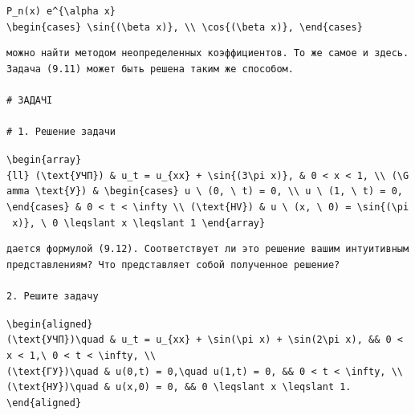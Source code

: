 \documentclass[
  ukrainian,
]{article}
\begin{document}
\texttt{P\_n(x)\ e\^{}\{\textbackslash{}alpha\ x\}}
\texttt{\textbackslash{}begin\{cases\}\ \textbackslash{}sin\{(\textbackslash{}beta\ x)\},\ \textbackslash{}\textbackslash{}\ \textbackslash{}cos\{(\textbackslash{}beta\ x)\},\ \textbackslash{}end\{cases\}}

\begin{verbatim}
можно найти методом неопределенных коэффициентов. То же самое и здесь. Задача (9.11) может быть решена таким же способом.

# ЗАДАЧІ

# 1. Решение задачи
\end{verbatim}

\texttt{\textbackslash{}begin\{array\}\{ll\}\ (\textbackslash{}text\{УЧП\})\ \&\ u\_t\ =\ u\_\{xx\}\ +\ \textbackslash{}sin\{(3\textbackslash{}pi\ x)\},\ \&\ 0\ \textless{}\ x\ \textless{}\ 1,\ \textbackslash{}\textbackslash{}\ (\textbackslash{}Gamma\ \textbackslash{}text\{У\})\ \&\ \textbackslash{}begin\{cases\}\ u\ \textbackslash{}\ (0,\ \textbackslash{}\ t)\ =\ 0,\ \textbackslash{}\textbackslash{}\ u\ \textbackslash{}\ (1,\ \textbackslash{}\ t)\ =\ 0,\ \textbackslash{}end\{cases\}\ \&\ 0\ \textless{}\ t\ \textless{}\ \textbackslash{}infty\ \textbackslash{}\textbackslash{}\ (\textbackslash{}text\{HV\})\ \&\ u\ \textbackslash{}\ (x,\ \textbackslash{}\ 0)\ =\ \textbackslash{}sin\{(\textbackslash{}pi\ x)\},\ \textbackslash{}\ 0\ \textbackslash{}leqslant\ x\ \textbackslash{}leqslant\ 1\ \textbackslash{}end\{array\}}

\begin{verbatim}
дается формулой (9.12). Соответствует ли это решение вашим интуитивным представлениям? Что представляет собой полученное решение?

2. Решите задачу
\end{verbatim}

\texttt{\textbackslash{}begin\{aligned\}}
\texttt{(\textbackslash{}text\{УЧП\})\textbackslash{}quad\ \&\ u\_t\ =\ u\_\{xx\}\ +\ \textbackslash{}sin(\textbackslash{}pi\ x)\ +\ \textbackslash{}sin(2\textbackslash{}pi\ x),\ \&\&\ 0\ \textless{}\ x\ \textless{}\ 1,\textbackslash{}\ 0\ \textless{}\ t\ \textless{}\ \textbackslash{}infty,\ \textbackslash{}\textbackslash{}}
\texttt{(\textbackslash{}text\{ГУ\})\textbackslash{}quad\ \&\ u(0,t)\ =\ 0,\textbackslash{}quad\ u(1,t)\ =\ 0,\ \&\&\ 0\ \textless{}\ t\ \textless{}\ \textbackslash{}infty,\ \textbackslash{}\textbackslash{}}
\texttt{(\textbackslash{}text\{НУ\})\textbackslash{}quad\ \&\ u(x,0)\ =\ 0,\ \&\&\ 0\ \textbackslash{}leqslant\ x\ \textbackslash{}leqslant\ 1.}
\texttt{\textbackslash{}end\{aligned\}}
\end{document}

